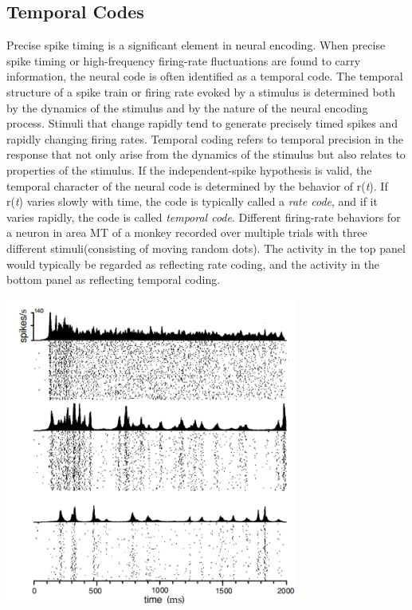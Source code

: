 \subsection{Temporal Codes}
\rul Precise spike timing is a significant element in neural encoding. When precise spike timing or high-frequency firing-rate fluctuations are found to carry information, the neural code is often identified as a temporal code.
\rem The temporal structure of a spike train or firing rate evoked by a stimulus is determined both by the dynamics of the stimulus and by the nature of the neural encoding process. Stimuli that change rapidly tend to generate precisely timed spikes and rapidly changing firing rates.
\rem Temporal coding refers to temporal precision in the response that not only arise from the dynamics of the stimulus but also relates to properties of the stimulus.
\rul If the independent-spike hypothesis is valid, the temporal character of the neural code is determined by the behavior of r(\emph{t}).
 If r(\emph{t}) varies slowly with time, the code is typically called a \emph{rate code}, and if it varies rapidly, the code is called \emph{temporal code}.
\exm Different firing-rate behaviors for a neuron in area MT of a monkey recorded over multiple trials with three different stimuli(consisting of moving random dots). The activity in the top panel would typically be regarded as reflecting rate coding, and the activity in the bottom panel as reflecting temporal coding.
\begin{center}
    \label{fig:1.19}
    \includegraphics[scale = 0.7]{./png/Figure1-19}\\
\end{center}

